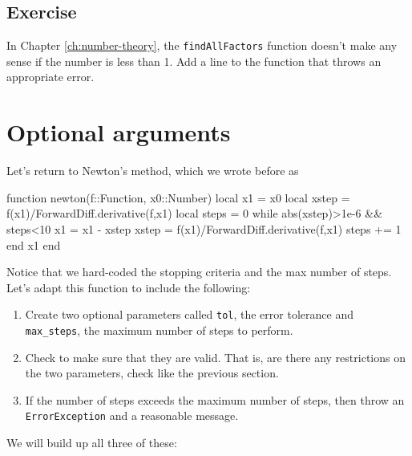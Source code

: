 \subsection{Exercise}

In Chapter \ref{ch:number-theory}, the \verb!findAllFactors! function doesn't make any sense if the number is less than 1.  Add a line to the function that throws an appropriate error. 


\section{Optional arguments}

Let's return to Newton's method, which we wrote before as 
\begin{jlverbatim}[adf]
function newton(f::Function, x0::Number)
  local x1 = x0
  local xstep = f(x1)/ForwardDiff.derivative(f,x1)
  local steps = 0
  while abs(xstep)>1e-6 && steps<10
    x1 = x1 - xstep
    xstep = f(x1)/ForwardDiff.derivative(f,x1)
    steps += 1
  end
  x1
end
\end{jlverbatim}

Notice that we hard-coded the stopping criteria and the max number of
steps. Let's adapt this function to include the following:

\begin{enumerate}
\item  Create two optional parameters called \verb!tol!, the error tolerance and \verb!max_steps!, the maximum number of steps to perform. 
\item  Check to make sure that they are valid.  That is, are there any restrictions on the two parameters, check like the previous section. 
\item  If the number of steps exceeds the maximum number of steps, then throw an \texttt{ErrorException} and a reasonable message.
\end{enumerate}

We will build up all three of these: 

